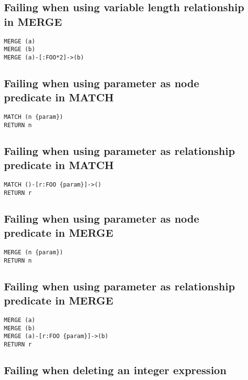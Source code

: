 \subsection{Failing when using variable length relationship in MERGE}

\begin{lstlisting}
MERGE (a)
MERGE (b)
MERGE (a)-[:FOO*2]->(b)
\end{lstlisting}

\subsection{Failing when using parameter as node predicate in MATCH}

\begin{lstlisting}
MATCH (n {param})
RETURN n
\end{lstlisting}

\subsection{Failing when using parameter as relationship predicate in MATCH}

\begin{lstlisting}
MATCH ()-[r:FOO {param}]->()
RETURN r
\end{lstlisting}

\subsection{Failing when using parameter as node predicate in MERGE}

\begin{lstlisting}
MERGE (n {param})
RETURN n
\end{lstlisting}

\subsection{Failing when using parameter as relationship predicate in MERGE}

\begin{lstlisting}
MERGE (a)
MERGE (b)
MERGE (a)-[r:FOO {param}]->(b)
RETURN r
\end{lstlisting}

\subsection{Failing when deleting an integer expression}

